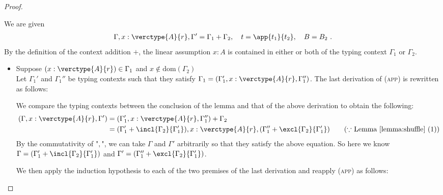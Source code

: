 \begin{proof}
\begin{itemize}
We are given
\begin{gather*}
\Gamma, x:\verctype{A}{r}, \Gamma' = \Gamma_1 + \Gamma_2,\quad
t = \app{t_1}{t_2},\quad
B = B_2
~.
\end{gather*}
By the definition of the context addition $+$, the linear assumption $x:A$ is contained in either or both of the typing context $\Gamma_1$ or $\Gamma_2$.
\begin{itemize}
\item Suppose $(x:\verctype{A}{r}) \in \Gamma_1$ and $x \notin \mathrm{dom}(\Gamma_2)$\\
Let $\Gamma_1'$ and $\Gamma_1''$ be typing contexts such that they satisfy $\Gamma_1 = (\Gamma_1', x:\verctype{A}{r}, \Gamma_1'')$.
The last derivation of (\textsc{app}) is rewritten as follows:
\begin{center}
    \begin{minipage}{.9\linewidth}
    \end{minipage}
\end{center}
We compare the typing contexts between the conclusion of the lemma and that of the above derivation to obtain the following:
\begin{align*}
(\Gamma, x:\verctype{A}{r}, \Gamma')
    &= (\Gamma_1', x:\verctype{A}{r}, \Gamma_1'' ) + \Gamma_2\\
    &= (\Gamma_1' + \incl{\Gamma_2}{\Gamma_1'}),x:\verctype{A}{r},(\Gamma_1'' + \excl{\Gamma_2}{\Gamma_1'})\tag{$\because$ Lemma \ref{lemma:shuffle} (1)}
\end{align*}
By the commutativity of "$,$", we can take $\Gamma$ and $\Gamma'$ arbitrarily so that they satisfy the above equation. So here we know $\Gamma = (\Gamma_1' + \incl{\Gamma_2}{\Gamma_1'})$ and $\Gamma' = (\Gamma_1'' + \excl{\Gamma_2}{\Gamma_1'})$.\par
We then apply the induction hypothesis to each of the two premises of the last derivation and reapply (\textsc{app}) as follows:
\begin{center}
    \begin{minipage}{.85\linewidth}
\end{minipage}
\end{center}
\end{itemize}
\end{itemize}
\end{proof}
